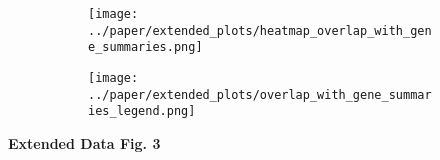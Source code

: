 \begin{figure}[H] 
    \begin{subfigure}[t]{0.2\textwidth}
        \caption{}
        \texttt{[image: ../paper/extended\_plots/heatmap\_overlap\_with\_gene\_summaries.png]}        
    \end{subfigure}   
    \begin{subfigure}[t]{0.8\textwidth}
        \caption{}
        \vspace{1cm}
        \texttt{[image: ../paper/extended\_plots/overlap\_with\_gene\_summaries\_legend.png]}        
    \end{subfigure}   
\end{figure}
\textbf{Extended Data Fig. 3}